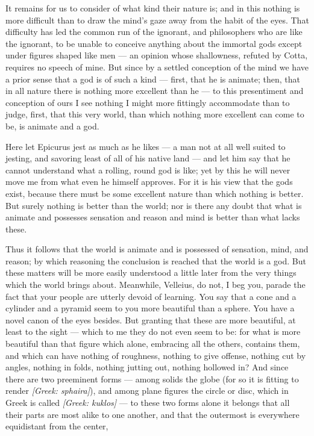  It remains for us to consider of what kind their nature is; and in this nothing is more difficult than to draw the mind's gaze away from the habit of the eyes. That difficulty has led the common run of the ignorant, and philosophers who are like the ignorant, to be unable to conceive anything about the immortal gods except under figures shaped like men — an opinion whose shallowness, refuted by Cotta, requires no speech of mine. But since by a settled conception of the mind we have a prior sense that a god is of such a kind — first, that he is animate; then, that in all nature there is nothing more excellent than he — to this presentiment and conception of ours I see nothing I might more fittingly accommodate than to judge, first, that this very world, than which nothing more excellent can come to be, is animate and a god.

 Here let Epicurus jest as much as he likes — a man not at all well suited to jesting, and savoring least of all of his native land — and let him say that he cannot understand what a rolling, round god is like; yet by this he will never move me from what even he himself approves. For it is his view that the gods exist, because there must be some excellent nature than which nothing is better. But surely nothing is better than the world; nor is there any doubt that what is animate and possesses sensation and reason and mind is better than what lacks these.

 Thus it follows that the world is animate and is possessed of sensation, mind, and reason; by which reasoning the conclusion is reached that the world is a god. But these matters will be more easily understood a little later from the very things which the world brings about. Meanwhile, Velleius, do not, I beg you, parade the fact that your people are utterly devoid of learning. You say that a cone and a cylinder and a pyramid seem to you more beautiful than a sphere. You have a novel canon of the eyes besides. But granting that these are more beautiful, at least to the sight — which to me they do not even seem to be: for what is more beautiful than that figure which alone, embracing all the others, contains them, and which can have nothing of roughness, nothing to give offense, nothing cut by angles, nothing in folds, nothing jutting out, nothing hollowed in? And since there are two preeminent forms — among solids the globe (for so it is fitting to render \textit{[Greek: sphaira]}), and among plane figures the circle or disc, which in Greek is called \textit{[Greek: kuklos]} — to these two forms alone it belongs that all their parts are most alike to one another, and that the outermost is everywhere equidistant from the center,

